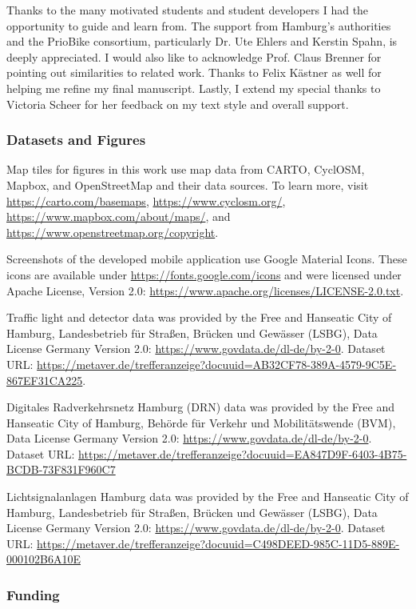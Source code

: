 \documentclass[
  ngerman,english, %
  fontsize=12pt,twoside,BCOR=6mm, %
  numbers=noenddot, %
  cd=fullcolor,
  open=right,
  headings=heavy,
  chapterpage=true,
  cdfont=off, %
  sfdefaults=false,
]{tudscrmanual}
\begin{document}
Thanks to the many motivated students and student developers I had the opportunity to guide and learn from. The support from Hamburg's authorities and the PrioBike consortium, particularly Dr. Ute Ehlers and Kerstin Spahn, is deeply appreciated. I would also like to acknowledge Prof. Claus Brenner for pointing out similarities to related work. Thanks to Felix Kästner as well for helping me refine my final manuscript. Lastly, I extend my special thanks to Victoria Scheer for her feedback on my text style and overall support.

\subsubsection*{Datasets and Figures}

Map tiles for figures in this work use map data from CARTO, CyclOSM, Mapbox, and OpenStreetMap and their data sources. To learn more, visit \url{https://carto.com/basemaps}, \url{https://www.cyclosm.org/}, \url{https://www.mapbox.com/about/maps/}, and \url{https://www.openstreetmap.org/copyright}.

Screenshots of the developed mobile application use Google Material Icons. These icons are available under \url{https://fonts.google.com/icons} and were licensed under Apache License, Version 2.0: \url{https://www.apache.org/licenses/LICENSE-2.0.txt}.

Traffic light and detector data was provided by the Free and Hanseatic City of Hamburg, Landesbetrieb für Straßen, Brücken und Gewässer (LSBG), Data License Germany Version 2.0: \url{https://www.govdata.de/dl-de/by-2-0}. Dataset URL: \url{https://metaver.de/trefferanzeige?docuuid=AB32CF78-389A-4579-9C5E-867EF31CA225}.

Digitales Radverkehrsnetz Hamburg (DRN) data was provided by the Free and Hanseatic City of Hamburg, Behörde für Verkehr und Mobilitätswende (BVM), Data License Germany Version 2.0: \url{https://www.govdata.de/dl-de/by-2-0}. Dataset URL: \url{https://metaver.de/trefferanzeige?docuuid=EA847D9F-6403-4B75-BCDB-73F831F960C7}

Lichtsignalanlagen Hamburg data was provided by the Free and Hanseatic City of Hamburg, Landesbetrieb für Straßen, Brücken und Gewässer (LSBG), Data License Germany Version 2.0: \url{https://www.govdata.de/dl-de/by-2-0}. Dataset URL: \url{https://metaver.de/trefferanzeige?docuuid=C498DEED-985C-11D5-889E-000102B6A10E}

\subsubsection*{Funding}
\end{document}
